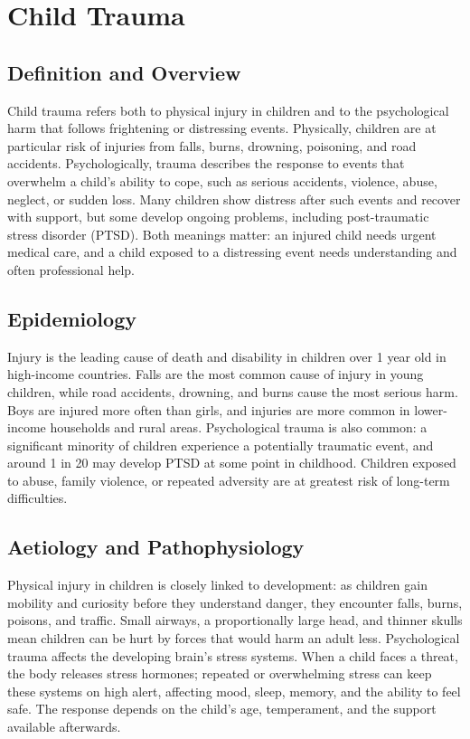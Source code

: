 \chapter{Child Trauma}

\section*{Definition and Overview}
Child trauma refers both to physical injury in children and to the psychological harm that follows frightening or distressing events. Physically, children are at particular risk of injuries from falls, burns, drowning, poisoning, and road accidents. Psychologically, trauma describes the response to events that overwhelm a child's ability to cope, such as serious accidents, violence, abuse, neglect, or sudden loss. Many children show distress after such events and recover with support, but some develop ongoing problems, including post-traumatic stress disorder (PTSD). Both meanings matter: an injured child needs urgent medical care, and a child exposed to a distressing event needs understanding and often professional help.

\section*{Epidemiology}
Injury is the leading cause of death and disability in children over 1 year old in high-income countries. Falls are the most common cause of injury in young children, while road accidents, drowning, and burns cause the most serious harm. Boys are injured more often than girls, and injuries are more common in lower-income households and rural areas. Psychological trauma is also common: a significant minority of children experience a potentially traumatic event, and around 1 in 20 may develop PTSD at some point in childhood. Children exposed to abuse, family violence, or repeated adversity are at greatest risk of long-term difficulties.

\section*{Aetiology and Pathophysiology}
Physical injury in children is closely linked to development: as children gain mobility and curiosity before they understand danger, they encounter falls, burns, poisons, and traffic. Small airways, a proportionally large head, and thinner skulls mean children can be hurt by forces that would harm an adult less. Psychological trauma affects the developing brain's stress systems. When a child faces a threat, the body releases stress hormones; repeated or overwhelming stress can keep these systems on high alert, affecting mood, sleep, memory, and the ability to feel safe. The response depends on the child's age, temperament, and the support available afterwards.

